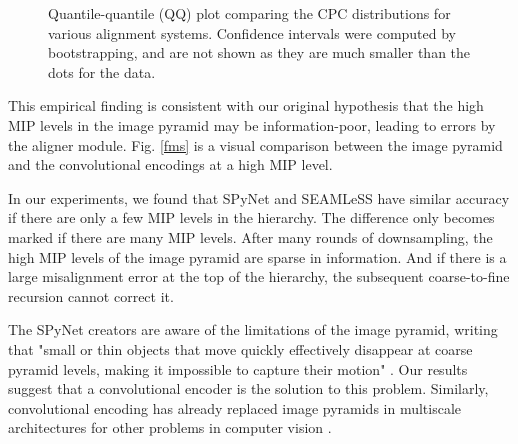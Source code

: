 \documentclass{article}
\begin{document}
\begin{figure}[htp]
    \centering
    \hfill
    \caption{Quantile-quantile (QQ) plot comparing the CPC distributions for various alignment systems. Confidence intervals were computed by bootstrapping, and are not shown as they are much smaller than the dots for the data.}
    \label{qqalign}

\end{figure}

This empirical finding is consistent with our original hypothesis that the high MIP levels in the image pyramid may be information-poor, leading to errors by the aligner module. Fig. \ref{fms} is a visual comparison between the image pyramid and the convolutional encodings at a high MIP level. 

In our experiments, we found that SPyNet and SEAMLeSS have similar accuracy if there are only a few MIP levels in the hierarchy. The difference only becomes marked if there are many MIP levels. After many rounds of downsampling, the high MIP levels of the image pyramid are sparse in information. And if there is a large misalignment error at the top of the hierarchy, the subsequent coarse-to-fine recursion cannot correct it.

The SPyNet creators are aware of the limitations of the image pyramid, writing that "small or thin objects that move quickly effectively disappear at
coarse pyramid levels, making it impossible to capture their
motion" \citet{ranjan2017optical}.  Our results suggest that a convolutional encoder is the solution to this problem. Similarly, convolutional encoding has already replaced image pyramids in multiscale architectures for other problems in computer vision \citep{burt1987laplacian, yoo2015multi}.
\end{document}
